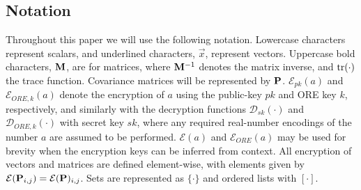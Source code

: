 \documentclass[letterpaper, 10 pt, journal, twoside]{ieeetran}  %
\begin{document}
\subsection{Notation}
Throughout this paper we will use the following notation. Lowercase characters represent scalars, and underlined characters, $\vec{x}$, represent vectors. Uppercase bold characters, ${{\mathbf{M}}}$, are for matrices, where ${{\mathbf{M}}}^{-1}$ denotes the matrix inverse, and $\operatorname{tr}(\cdot)$ the trace function. Covariance matrices will be represented by ${{\mathbf{P}}}$. $\mathcal{E}_{pk}(a)$ and $\mathcal{E}_{ORE,k}(a)$ denote the encryption of $a$ using the public-key $pk$ and ORE key $k$, respectively, and similarly with the decryption functions $\mathcal{D}_{sk}(\cdot)$ and $\mathcal{D}_{ORE,k}(\cdot)$ with secret key $sk$, where any required real-number encodings of the number $a$ are assumed to be performed. $\mathcal{E}(a)$ and $\mathcal{E}_{ORE}(a)$ may be used for brevity when the encryption keys can be inferred from context. All encryption of vectors and matrices are defined element-wise, with elements given by $\mathcal{E}({{\mathbf{P}}}_{i,j}) = \mathcal{E}({{\mathbf{P}}})_{i,j}$. Sets are represented as $\{\cdot\}$ and ordered lists with $[\cdot]$.

\end{document}
